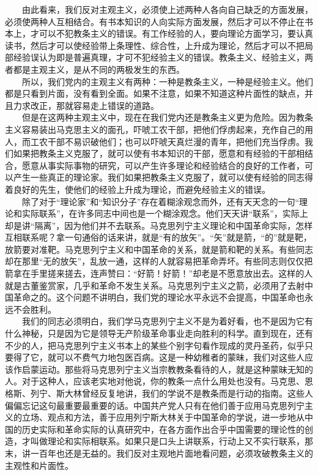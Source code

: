 \documentclass[cn,11pt,chinese]{elegantbook}
\begin{document}
　　由此看来，我们反对主观主义，必须使上述两种人各向自己缺乏的方面发展，必须使两种人互相结合。有书本知识的人向实际方面发展，然后才可以不停止在书本上，才可以不犯教条主义的错误。有工作经验的人，要向理论方面学习，要认真读书，然后才可以使经验带上条理性、综合性，上升成为理论，然后才可以不把局部经验误认为即是普遍真理，才可不犯经验主义的错误。教条主义、经验主义，两者都是主观主义，是从不同的两极发生的东西。\\
　　所以，我们党内的主观主义有两种：一种是教条主义，一种是经验主义。他们都是只看到片面，没有看到全面。如果不注意，如果不知道这种片面性的缺点，并且力求改正，那就容易走上错误的道路。\\
　　但是在这两种主观主义中，现在在我们党内还是教条主义更为危险。因为教条主义容易装出马克思主义的面孔，吓唬工农干部，把他们俘虏起来，充作自己的用人，而工农干部不易识破他们；也可以吓唬天真烂漫的青年，把他们充当俘虏。我们如果把教条主义克服了，就可以使有书本知识的干部，愿意和有经验的干部相结合，愿意从事实际事物的研究，可以产生许多理论和经验结合的良好的工作者，可以产生一些真正的理论家。我们如果把教条主义克服了，就可以使有经验的同志得着良好的先生，使他们的经验上升成为理论，而避免经验主义的错误。\\
　　除了对于“理论家”和“知识分子”存在着糊涂观念而外，还有天天念的一句“理论和实际联系”，在许多同志中间也是一个糊涂观念。他们天天讲“联系”，实际上却是讲“隔离”，因为他们并不去联系。马克思列宁主义理论和中国革命实际，怎样互相联系呢？拿一句通俗的话来讲，就是“有的放矢”。“矢”就是箭，“的”就是靶，放箭要对准靶。马克思列宁主义和中国革命的关系，就是箭和靶的关系。有些同志却在那里“无的放矢”，乱放一通，这样的人就容易把革命弄坏。有些同志则仅仅把箭拿在手里搓来搓去，连声赞曰：“好箭！好箭！”却老是不愿意放出去。这样的人就是古董鉴赏家，几乎和革命不发生关系。马克思列宁主义之箭，必须用了去射中国革命之的。这个问题不讲明白，我们党的理论水平永远不会提高，中国革命也永远不会胜利。\\
　　我们的同志必须明白，我们学马克思列宁主义不是为着好看，也不是因为它有什么神秘，只是因为它是领导无产阶级革命事业走向胜利的科学。直到现在，还有不少的人，把马克思列宁主义书本上的某些个别字句看作现成的灵丹圣药，似乎只要得了它，就可以不费气力地包医百病。这是一种幼稚者的蒙昧，我们对这些人应该作启蒙运动。那些将马克思列宁主义当宗教教条看待的人，就是这种蒙昧无知的人。对于这种人，应该老实地对他说，你的教条一点什么用处也没有。马克思、恩格斯、列宁、斯大林曾经反复地讲，我们的学说不是教条而是行动的指南。这些人偏偏忘记这句最重要最重要的话。中国共产党人只有在他们善于应用马克思列宁主义的立场、观点和方法，善于应用列宁斯大林关于中国革命的学说，进一步地从中国的历史实际和革命实际的认真研究中，在各方面作出合乎中国需要的理论性的创造，才叫做理论和实际相联系。如果只是口头上讲联系，行动上又不实行联系，那末，讲一百年也还是无益的。我们反对主观地片面地看问题，必须攻破教条主义的主观性和片面性。\\
\end{document}
